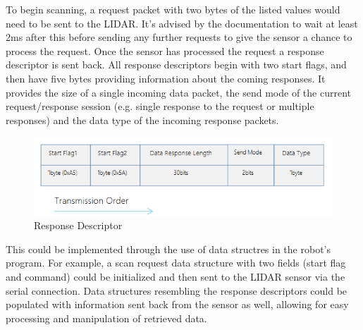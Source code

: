 				To begin scanning, a request packet with two bytes of the listed values would need to be sent to the LIDAR. It's advised by the documentation to wait at least 2ms after this before sending any further requests to give the sensor a chance to process the request. Once the sensor has processed the request a response descriptor is sent back. All response descriptors begin with two start flags, and then have five bytes providing information about the coming responses. It provides the size of a single incoming data packet, the send mode of the current request/response session (e.g. single response to the request or multiple responses) and the data type of the incoming response packets.  
				\begin{figure}[h]
					\centering
					\includegraphics[width=.9\linewidth]{SYNTHESIS/responsedescriptor.png}
					\caption{Response Descriptor}
					\label{fig:responsedescriptor}
				\end{figure}
				
				This could be implemented through the use of data structres in the robot's program. For example, a scan request data structure with two fields (start flag and command) could be initialized and then sent to the LIDAR sensor via the serial connection. Data structures resembling the response descriptors could be populated with information sent back from the sensor as well, allowing for easy processing and manipulation of retrieved data.
				
